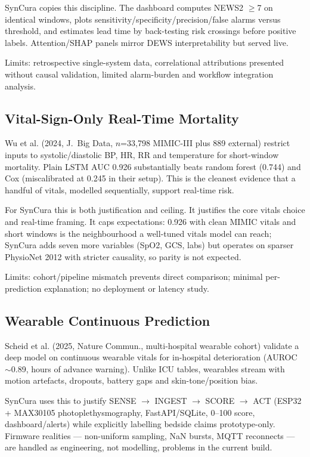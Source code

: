 \documentclass[a4paper,conference]{IEEEtran}
\begin{document}
SynCura copies this discipline. The dashboard computes NEWS2 $\ge$7 on identical windows, plots sensitivity/specificity/precision/false alarms versus threshold, and estimates lead time by back-testing risk crossings before positive labels. Attention/SHAP panels mirror DEWS interpretability but served live.

Limits: retrospective single-system data, correlational attributions presented without causal validation, limited alarm-burden and workflow integration analysis.

\subsection{Vital-Sign-Only Real-Time Mortality}
Wu et al. (2024, J.\ Big Data, $n$=33,798 MIMIC-III plus 889 external) restrict inputs to systolic/diastolic BP, HR, RR and temperature for short-window mortality. Plain LSTM AUC 0.926 substantially beats random forest (0.744) and Cox (miscalibrated at 0.245 in their setup). This is the cleanest evidence that a handful of vitals, modelled sequentially, support real-time risk.

For SynCura this is both justification and ceiling. It justifies the core vitals choice and real-time framing. It caps expectations: 0.926 with clean MIMIC vitals and short windows is the neighbourhood a well-tuned vitals model can reach; SynCura adds seven more variables (SpO2, GCS, labs) but operates on sparser PhysioNet 2012 with stricter causality, so parity is not expected.

Limits: cohort/pipeline mismatch prevents direct comparison; minimal per-prediction explanation; no deployment or latency study.

\subsection{Wearable Continuous Prediction}
Scheid et al. (2025, Nature Commun., multi-hospital wearable cohort) validate a deep model on continuous wearable vitals for in-hospital deterioration (AUROC $\sim$0.89, hours of advance warning). Unlike ICU tables, wearables stream with motion artefacts, dropouts, battery gaps and skin-tone/position bias.

SynCura uses this to justify SENSE $\rightarrow$ INGEST $\rightarrow$ SCORE $\rightarrow$ ACT (ESP32 + MAX30105 photoplethysmography, FastAPI/SQLite, 0--100 score, dashboard/alerts) while explicitly labelling bedside claims prototype-only. Firmware realities --- non-uniform sampling, NaN bursts, MQTT reconnects --- are handled as engineering, not modelling, problems in the current build.
\end{document}

